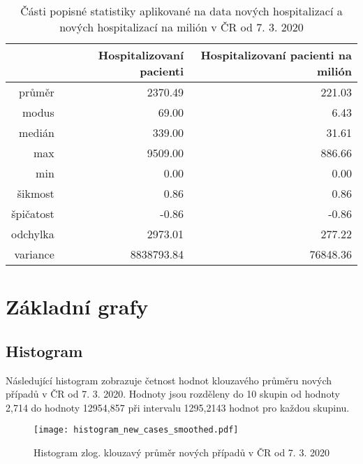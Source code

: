 \documentclass[a4paper, 12pt]{article}
\begin{document}
\begin{table}[ht]
\centering
\begin{tabular}{rrr}
  \hline
 & Hospitalizovaní pacienti & Hospitalizovaní pacienti na milión \\ 
  \hline
průměr & 2370.49 & 221.03 \\ 
  modus & 69.00 & 6.43 \\ 
  medián & 339.00 & 31.61 \\ 
  max & 9509.00 & 886.66 \\ 
  min & 0.00 & 0.00 \\ 
  šikmost & 0.86 & 0.86 \\ 
  špičatost & -0.86 & -0.86 \\ 
  odchylka & 2973.01 & 277.22 \\ 
  variance & 8838793.84 & 76848.36 \\ 
   \hline
\end{tabular}
\caption{Části popisné statistiky aplikované na data nových hospitalizací a nových hospitalizací na milión v ČR od 7. 3. 2020} 
\label{table:popisStat}
\end{table}


\section{Základní grafy}
\subsection{Histogram}

Následující histogram zobrazuje četnost hodnot klouzavého průměru nových případů v ČR od 7. 3. 2020.
Hodnoty jsou rozděleny do 10 skupin od hodnoty 2,714 do hodnoty 12954,857 při intervalu
1295,2143 hodnot pro každou skupinu.

\begin{figure}[H]
\centering
\texttt{[image: histogram\_new\_cases\_smoothed.pdf]}
\caption{Histogram zlog. klouzavý průměr nových případů v ČR od 7. 3. 2020}
\end{figure}
\end{document}
